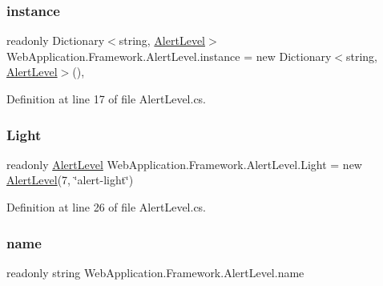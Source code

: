 \subsubsection{\texorpdfstring{instance}{instance}}
{\footnotesize\ttfamily readonly Dictionary$<$string, \mbox{\hyperlink{classWebApplication_1_1Framework_1_1AlertLevel}{Alert\+Level}}$>$ Web\+Application.\+Framework.\+Alert\+Level.\+instance = new Dictionary$<$string, \mbox{\hyperlink{classWebApplication_1_1Framework_1_1AlertLevel}{Alert\+Level}}$>$()\hspace{0.3cm}{\ttfamily [static]}, {\ttfamily [private]}}



Definition at line 17 of file Alert\+Level.\+cs.

\mbox{\label{classWebApplication_1_1Framework_1_1AlertLevel_a70b5e8d90d75b06169650f80e41530f2}} 
\subsubsection{\texorpdfstring{Light}{Light}}
{\footnotesize\ttfamily readonly \mbox{\hyperlink{classWebApplication_1_1Framework_1_1AlertLevel}{Alert\+Level}} Web\+Application.\+Framework.\+Alert\+Level.\+Light = new \mbox{\hyperlink{classWebApplication_1_1Framework_1_1AlertLevel}{Alert\+Level}}(7, \char`\"{}alert-\/light\char`\"{})\hspace{0.3cm}{\ttfamily [static]}}



Definition at line 26 of file Alert\+Level.\+cs.

\mbox{\label{classWebApplication_1_1Framework_1_1AlertLevel_ad61a3ca4bbd6bf6e4c75f440cd7b05a1}} 
\subsubsection{\texorpdfstring{name}{name}}
{\footnotesize\ttfamily readonly string Web\+Application.\+Framework.\+Alert\+Level.\+name\hspace{0.3cm}{\ttfamily [private]}}



